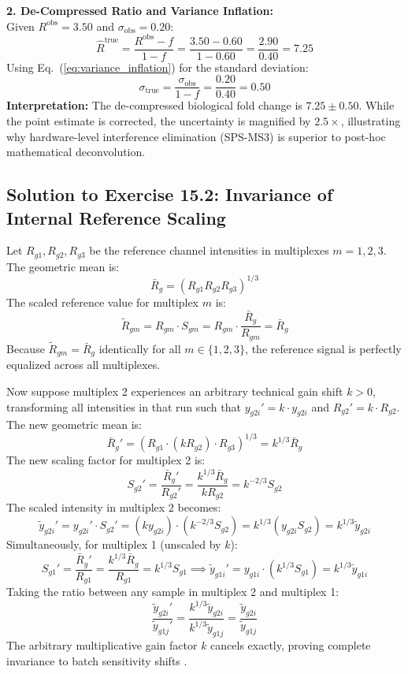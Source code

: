 \documentclass[11pt,oneside]{book}
\begin{document}
\textbf{2. De-Compressed Ratio and Variance Inflation:}\\
Given $R^{\text{obs}} = 3.50$ and $\sigma_{\text{obs}} = 0.20$:
\begin{equation*}
\hat{R}^{\text{true}} = \frac{R^{\text{obs}} - f}{1 - f} = \frac{3.50 - 0.60}{1 - 0.60} = \frac{2.90}{0.40} = 7.25
\end{equation*}
Using Eq.~(\ref{eq:variance_inflation}) for the standard deviation:
\begin{equation*}
\sigma_{\text{true}} = \frac{\sigma_{\text{obs}}}{1 - f} = \frac{0.20}{0.40} = 0.50
\end{equation*}
\textbf{Interpretation:} The de-compressed biological fold change is $7.25 \pm 0.50$. While the point estimate is corrected, the uncertainty is magnified by $2.5\times$, illustrating why hardware-level interference elimination (SPS-MS3) is superior to post-hoc mathematical deconvolution.

\subsection*{Solution to Exercise 15.2: Invariance of Internal Reference Scaling}
Let $R_{g1}, R_{g2}, R_{g3}$ be the reference channel intensities in multiplexes $m = 1, 2, 3$. The geometric mean is:
$$\bar{R}_g = \left( R_{g1} R_{g2} R_{g3} \right)^{1/3}$$
The scaled reference value for multiplex $m$ is:
$$\tilde{R}_{gm} = R_{gm} \cdot S_{gm} = R_{gm} \cdot \frac{\bar{R}_g}{R_{gm}} = \bar{R}_g$$
Because $\tilde{R}_{gm} = \bar{R}_g$ identically for all $m \in \{1, 2, 3\}$, the reference signal is perfectly equalized across all multiplexes.

Now suppose multiplex 2 experiences an arbitrary technical gain shift $k > 0$, transforming all intensities in that run such that $y_{g2i}' = k \cdot y_{g2i}$ and $R_{g2}' = k \cdot R_{g2}$. The new geometric mean is:
$$\bar{R}_g' = \left( R_{g1} \cdot (k R_{g2}) \cdot R_{g3} \right)^{1/3} = k^{1/3} \bar{R}_g$$
The new scaling factor for multiplex 2 is:
$$S_{g2}' = \frac{\bar{R}_g'}{R_{g2}'} = \frac{k^{1/3} \bar{R}_g}{k R_{g2}} = k^{-2/3} S_{g2}$$
The scaled intensity in multiplex 2 becomes:
$$\tilde{y}_{g2i}' = y_{g2i}' \cdot S_{g2}' = (k y_{g2i}) \cdot (k^{-2/3} S_{g2}) = k^{1/3} \left( y_{g2i} S_{g2} \right) = k^{1/3} \tilde{y}_{g2i}$$
Simultaneously, for multiplex 1 (unscaled by $k$):
$$S_{g1}' = \frac{\bar{R}_g'}{R_{g1}} = \frac{k^{1/3} \bar{R}_g}{R_{g1}} = k^{1/3} S_{g1} \implies \tilde{y}_{g1i}' = y_{g1i} \cdot (k^{1/3} S_{g1}) = k^{1/3} \tilde{y}_{g1i}$$
Taking the ratio between any sample in multiplex 2 and multiplex 1:
$$\frac{\tilde{y}_{g2i}'}{\tilde{y}_{g1j}'} = \frac{k^{1/3} \tilde{y}_{g2i}}{k^{1/3} \tilde{y}_{g1j}} = \frac{\tilde{y}_{g2i}}{\tilde{y}_{g1j}}$$
The arbitrary multiplicative gain factor $k$ cancels exactly, proving complete invariance to batch sensitivity shifts \cite{plubell2017extended}.
\end{document}
